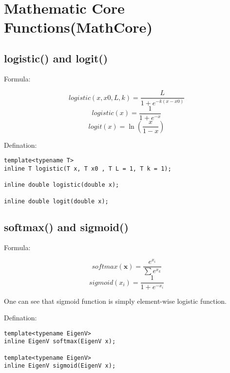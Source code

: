 \chapter{Mathematic Core Functions(MathCore)}
\section{logistic() and logit()}
\noindent Formula:

$$logistic(x,x0,L,k)=\frac{L}{1+e^{-k(x-x0)}}$$
$$logistic(x)=\frac{1}{1+e^{-x}}$$
$$logit(x)=\ln(\frac{x}{1-x})$$

\noindent Defination:
\begin{lstlisting}
template<typename T>
inline T logistic(T x, T x0 , T L = 1, T k = 1);

inline double logistic(double x);

inline double logit(double x);
\end{lstlisting}

\section{softmax() and sigmoid()}
\noindent Formula:

$$softmax(\mathbf{x})=\frac{e^{x_i}}{\sum e^{x_k}}$$
$$sigmoid(x_i)=\frac{1}{1+e^{-x_i}}$$

One can see that sigmoid function is simply element-wise logistic function.

\noindent Defination:
\begin{lstlisting}
template<typename EigenV>
inline EigenV softmax(EigenV x);

template<typename EigenV>
inline EigenV sigmoid(EigenV x);
\end{lstlisting}
